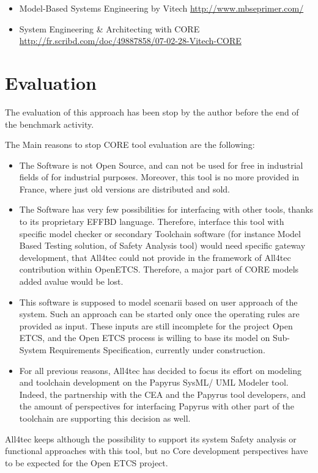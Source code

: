 \begin{itemize}
\item Model-Based Systems Engineering by Vitech
\url{http://www.mbseprimer.com/}

\item System Engineering \& Architecting with CORE
\url{http://fr.scribd.com/doc/49887858/07-02-28-Vitech-CORE}

\end{itemize}

\section{Evaluation}

The evaluation of this approach has been stop by the author before the end of the benchmark activity.


\begin{author_comment}

The Main reasons to stop CORE tool evaluation are the following:
\begin{itemize}
\item The Software is not Open Source, and can not be used for free in industrial fields of for industrial purposes. Moreover, this tool is no more provided in France, where just old versions are distributed and sold.
\item The Software has very few possibilities for interfacing with other tools, thanks to its proprietary EFFBD language. Therefore, interface this tool with specific model checker or secondary Toolchain software (for instance Model Based Testing solution, of Safety Analysis tool) would need specific gateway development, that All4tec could not provide in the framework of All4tec contribution within OpenETCS. Therefore, a major part of  CORE models added avalue would be lost.
\item This software is supposed to model scenarii based on user approach of the system. Such an approach can be started only once the operating rules are provided as input. These inputs are still incomplete for the project Open ETCS, and the Open ETCS process is willing to base its model on Sub-System Requirements Specification, currently under construction.
\item For all previous reasons, All4tec has decided to focus its effort on modeling and toolchain development on the Papyrus SysML/ UML Modeler tool. Indeed, the partnership with the CEA and the Papyrus tool developers, and the amount of perspectives for interfacing Papyrus with other part of the toolchain are supporting this decision as well.
\end{itemize}

All4tec keeps although the possibility to support its system Safety analysis or functional approaches with this tool, but no Core development perspectives have to be expected for the Open ETCS project.

\end{author_comment}